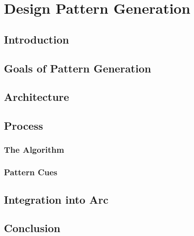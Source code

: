 \chapter{Design Pattern Generation}

\section{Introduction}

\section{Goals of Pattern Generation}

\section{Architecture}

\section{Process}

\subsection{The Algorithm}

\subsection{Pattern Cues}

\section{Integration into Arc}

\section{Conclusion}